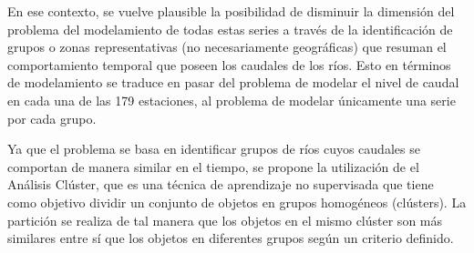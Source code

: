 \documentclass[12pt,oneside]{book}\usepackage[]{graphicx}\usepackage[]{color}
\theoremstyle{definition} %
\begin{document}
En ese contexto, se vuelve plausible la posibilidad de disminuir la dimensión del problema del modelamiento de todas estas series a través de la identificación de grupos o zonas representativas (no necesariamente geográficas) que resuman el comportamiento temporal que poseen los caudales de los ríos. Esto en términos de modelamiento se traduce en pasar del problema de modelar el nivel de caudal en cada una de las 179 estaciones, al problema de modelar únicamente una serie por cada grupo.






Ya que el problema se basa en identificar grupos de ríos cuyos caudales se comportan de manera similar en el tiempo, se propone la utilización de el Análisis Clúster, que es una técnica de aprendizaje no supervisada que tiene como objetivo dividir un conjunto de objetos en grupos homogéneos (clústers). La partición se realiza de tal manera que los objetos en el mismo clúster son más similares entre sí que los objetos en diferentes grupos según un criterio definido. 
\end{document}

